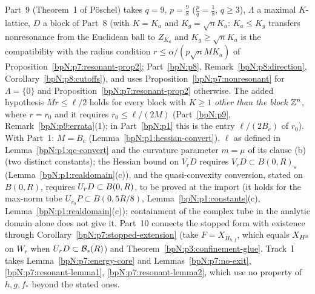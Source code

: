 \begin{remark}[Consumers]\label{bpN:p7:consumers}
Part~9 (Theorem~1 of P\"oschel) takes $q=9$, $p=\frac98$ ($\frac pq=\frac18$, $q\ge3$), $\Lambda$ a maximal $K$-lattice, $D$ a block of Part~8 (with $K=K_a$ and $K_g=\sqrt nK_a$: $K_a\le K_g$ transfers nonresonance from the Euclidean ball to $Z_{K_a}$ and $K_g\ge\sqrt nK_a$ is the compatibility with the radius condition $r\le\alpha/(p\sqrt nMK_a)$ of Proposition~\ref{bpN:p7:resonant-prop2}; Part~\ref{bpN:p8}, Remark~\ref{bpN:p8:direction}, Corollary~\ref{bpN:p8:cutoffs}), and uses Proposition~\ref{bpN:p7:nonresonant} for $\Lambda=\{0\}$ and Proposition~\ref{bpN:p7:resonant-prop2} otherwise. The added hypothesis $Mr\le\ell/2$ holds for every block with $K\ge1$ \emph{other than the block $\mathbb{Z}^n$}, where $r=r_0$ and it requires $r_0\le\ell/(2M)$ (Part~\ref{bpN:p9}, Remark~\ref{bpN:p9:errata}(1); in Part~\ref{bpN:p1} this is the entry $\ell/(2B_c)$ of $r_0$). With Part~1: $M=B_c$ (Lemma~\ref{bpN:p1:hessian-convert}), $\ell$ as defined in Lemma~\ref{bpN:p1:qc-convert} and the curvature parameter $m=\mu$ of its clause (b) (two distinct constants); the Hessian bound on $V_rD$ requires $V_rD\subset B(0,R)_s$ (Lemma~\ref{bpN:p1:realdomain}(c)), and the quasi-convexity conversion, stated on $B(0,R)$, requires $U_{r}D\subset B(0,R)$, to be proved at the import (it holds for the max-norm tube $U_{r_0}P\subset B(0,5R/8)$, Lemma~\ref{bpN:p1:constants}(c), Lemma~\ref{bpN:p1:realdomain}(c)); containment of the complex tube in the analytic domain alone does not give it. Part~10 connects the stopped form with existence through Corollary~\ref{bpN:p7:stopped-extension} (take $F=X_{H_{h,f}}$, which equals $X_{H^{\mathbb{R}}}$ on $W_r$ when $U_{r}D\subset\mathcal B_s(R)$) and Theorem~\ref{bpN:p3:confinement-glue}. Track~I takes Lemma~\ref{bpN:p7:energy-core} and Lemmas~\ref{bpN:p7:no-exit}, \ref{bpN:p7:resonant-lemma1}, \ref{bpN:p7:resonant-lemma2}, which use no property of $h,g,f_*$ beyond the stated ones.
\end{remark}
\endgroup
